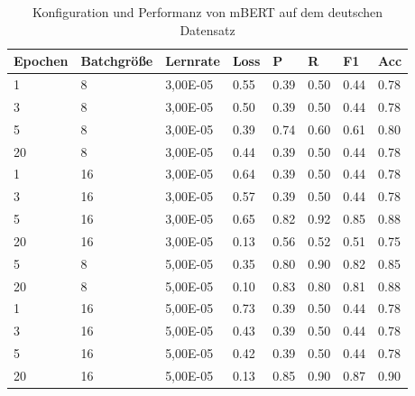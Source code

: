 \documentclass[ngerman]{ttlab-qualify}
\begin{document}
\begin{table}[!ht]
    \centering
    \caption{Konfiguration und Performanz von mBERT auf dem deutschen Datensatz}
    \begin{tabular}{|l|l|l|l|l|l|l|l|}
    \hline
        \textbf{Epochen} & \textbf{Batchgröße} & \textbf{Lernrate} & \textbf{Loss} & \textbf{P} & \textbf{R} & \textbf{F1} & \textbf{Acc} \\ \hline
        1 & 8 & 3,00E-05 & 0.55 & 0.39 & 0.50 & 0.44 & 0.78 \\ \hline
        3 & 8 & 3,00E-05 & 0.50 & 0.39 & 0.50 & 0.44 & 0.78 \\ \hline
        5 & 8 & 3,00E-05 & 0.39 & 0.74 & 0.60 & 0.61 & 0.80 \\ \hline
        20 & 8 & 3,00E-05 & 0.44 & 0.39 & 0.50 & 0.44 & 0.78 \\ \hline
        1 & 16 & 3,00E-05 & 0.64 & 0.39 & 0.50 & 0.44 & 0.78 \\ \hline
        3 & 16 & 3,00E-05 & 0.57 & 0.39 & 0.50 & 0.44 & 0.78 \\ \hline
        5 & 16 & 3,00E-05 & 0.65 & 0.82 & 0.92 & 0.85 & 0.88 \\ \hline
        20 & 16 & 3,00E-05 & 0.13 & 0.56 & 0.52 & 0.51 & 0.75 \\ \hline
        5 & 8 & 5,00E-05 & 0.35 & 0.80 & 0.90 & 0.82 & 0.85 \\ \hline
        20 & 8 & 5,00E-05 & 0.10 & 0.83 & 0.80 & 0.81 & 0.88 \\ \hline
        1 & 16 & 5,00E-05 & 0.73 & 0.39 & 0.50 & 0.44 & 0.78 \\ \hline
        3 & 16 & 5,00E-05 & 0.43 & 0.39 & 0.50 & 0.44 & 0.78 \\ \hline
        5 & 16 & 5,00E-05 & 0.42 & 0.39 & 0.50 & 0.44 & 0.78 \\ \hline
        20 & 16 & 5,00E-05 & 0.13 & 0.85 & 0.90 & 0.87 & 0.90 \\ \hline
    \end{tabular}
\end{table}
\newpage
\end{document}
